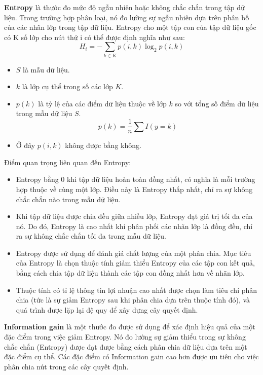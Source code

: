 \documentclass[a4paper]{article}
\begin{document}
\textbf{Entropy} là thước đo mức độ ngẫu nhiên hoặc không chắc chắn trong tập dữ liệu. Trong trường hợp phân loại, nó đo lường sự ngẫu nhiên dựa trên phân bố của các nhãn lớp trong tập dữ liệu.
Entropy cho một tập con của tập dữ liệu gốc có K số lớp cho nút thứ i có thể được định nghĩa như sau\cite{geeksforgeeks_decision_tree}:
\begin{equation}
H_i = -\sum_{k \in K } p(i, k) \log_{2} p(i, k)
\label{eq:entropy_i}
\end{equation}
\begin{itemize}
    \item $S$ là mẫu dữ liệu.
    \item $k$ là lớp cụ thể trong số các lớp $K$.
    \item $p(k)$ là tỷ lệ của các điểm dữ liệu thuộc về lớp $k$ so với tổng số điểm dữ liệu trong mẫu dữ liệu $S$.
    \[
    p(k) = \frac{1}{n} \sum I(y = k)
    \]
    \item Ở đây $p(i,k)$ không được bằng không.
\end{itemize}
Điểm quan trọng liên quan đến Entropy:
\begin{itemize}
    \item Entropy bằng 0 khi tập dữ liệu hoàn toàn đồng nhất, có nghĩa là mỗi trường hợp thuộc về cùng một lớp. Điều này là Entropy thấp nhất, chỉ ra sự không chắc chắn nào trong mẫu dữ liệu.
    \item Khi tập dữ liệu được chia đều giữa nhiều lớp, Entropy đạt giá trị tối đa của nó. Do đó, Entropy là cao nhất khi phân phối các nhãn lớp là đồng đều, chỉ ra sự không chắc chắn tối đa trong mẫu dữ liệu.
    \item Entropy được sử dụng để đánh giá chất lượng của một phân chia. Mục tiêu của Entropy là chọn thuộc tính giảm thiểu Entropy của các tập con kết quả, bằng cách chia tập dữ liệu thành các tập con đồng nhất hơn về nhãn lớp.
    \item Thuộc tính có tỉ lệ thông tin lợi nhuận cao nhất được chọn làm tiêu chí phân chia (tức là sự giảm Entropy sau khi phân chia dựa trên thuộc tính đó), và quá trình được lặp lại đệ quy để xây dựng cây quyết định.    
\end{itemize}

\textbf{Information gain }là một thước đo được sử dụng để xác định hiệu quả của một đặc điểm trong việc giảm Entropy. Nó đo lường sự giảm thiểu trong sự không chắc chắn (Entropy) được đạt được bằng cách phân chia dữ liệu dựa trên một đặc điểm cụ thể. Các đặc điểm có Information gain cao hơn được ưu tiên cho việc phân chia nút trong các cây quyết định.
\end{document}
